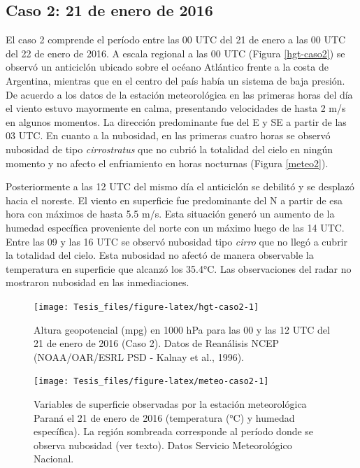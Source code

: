 \documentclass[12pt,spanish,oneside, a4paper]{book}
\begin{document}
\subsection{Caso 2: 21 de enero de
2016}\label{caso-2-21-de-enero-de-2016}

El caso 2 comprende el período entre las 00 UTC del 21 de enero a las 00
UTC del 22 de enero de 2016. A escala regional a las 00 UTC (Figura
\ref{hgt-caso2}) se observó un anticiclón ubicado sobre el océano
Atlántico frente a la costa de Argentina, mientras que en el centro del
país había un sistema de baja presión. De acuerdo a los datos de la
estación meteorológica en las primeras horas del día el viento estuvo
mayormente en calma, presentando velocidades de hasta 2 m/s en algunos
momentos. La dirección predominante fue del E y SE a partir de las 03
UTC. En cuanto a la nubosidad, en las primeras cuatro horas se observó
nubosidad de tipo \emph{cirrostratus} que no cubrió la totalidad del
cielo en ningún momento y no afecto el enfriamiento en horas nocturnas
(Figura \ref{meteo2}).

Posteriormente a las 12 UTC del mismo día el anticiclón se debilitó y se
desplazó hacia el noreste. El viento en superficie fue predominante del
N a partir de esa hora con máximos de hasta 5.5 m/s. Esta situación
generó un aumento de la humedad específica proveniente del norte con un
máximo luego de las 14 UTC. Entre las 09 y las 16 UTC se observó
nubosidad tipo \emph{cirro} que no llegó a cubrir la totalidad del
cielo. Esta nubosidad no afectó de manera observable la temperatura en
superficie que alcanzó los 35.4°C. Las observaciones del radar no
mostraron nubosidad en las inmediaciones.

\begin{figure}

{\centering \texttt{[image: Tesis\_files/figure-latex/hgt-caso2-1]} 

}

\caption{Altura geopotencial (mpg) en 1000 hPa para las 00 y las 12 UTC del 21 de enero de 2016 (Caso 2). Datos de Reanálisis NCEP (NOAA/OAR/ESRL PSD - Kalnay et al., 1996). \label{hgt-caso2}}\label{fig:hgt-caso2}
\end{figure}

\begin{figure}

{\centering \texttt{[image: Tesis\_files/figure-latex/meteo-caso2-1]} 

}

\caption{Variables de superficie observadas por la estación meteorológica Paraná el 21 de enero de 2016 (temperatura (°C) y humedad específica). La región sombreada corresponde al período donde se observa nubosidad (ver texto). Datos Servicio Meteorológico Nacional. \label{meteo2}}\label{fig:meteo-caso2}
\end{figure}
\end{document}
